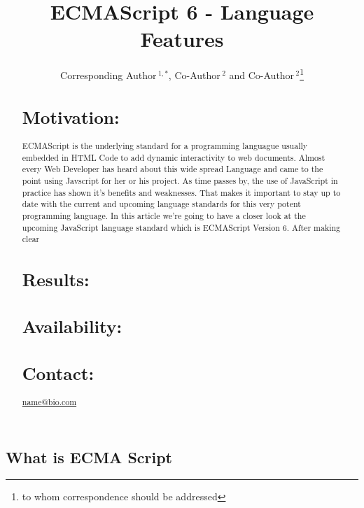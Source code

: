 \documentclass{bioinfo}
\begin{document}

\title[short Title]{ECMAScript 6 - Language Features}
\author[Sample \textit{et~al}]{Corresponding Author\,$^{1,*}$, Co-Author\,$^{2}$ and Co-Author\,$^2$\footnote{to whom correspondence should be addressed}}
\address{$^{1}$Department of XXXXXXX, Address XXXX etc.\\
$^{2}$Department of XXXXXXXX, Address XXXX etc.}



\maketitle

\begin{abstract}

\section{Motivation:}
ECMAScript is the underlying standard for a programming languague usually embedded in HTML Code to add dynamic interactivity to web documents. 
Almost every Web Developer has heard about this wide spread Language and came to the point using Javscript for her or his project. 
As time passes by, the use of JavaScript in practice has shown it's benefits and weaknesses.
That makes it important to stay up to date with the current and upcoming language standards for this very potent programming language.  
In this article we're going to have a closer look at the upcoming JavaScript language standard which is ECMAScript Version 6.
After making clear 

\section{Results:}

\section{Availability:}

\section{Contact:} \href{name@bio.com}{name@bio.com}
\end{abstract}

\subsection{What is ECMA Script}
\end{document}

